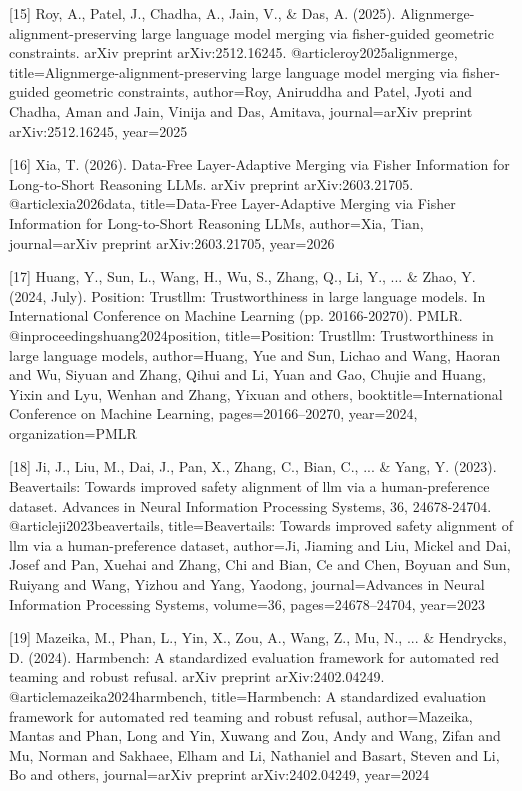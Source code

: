 \documentclass{article}
\begin{document}
{[15] Roy, A., Patel, J., Chadha, A., Jain, V., & Das, A. (2025). Alignmerge-alignment-preserving large language model merging via fisher-guided geometric constraints. arXiv preprint arXiv:2512.16245.
@article{roy2025alignmerge,
  title={Alignmerge-alignment-preserving large language model merging via fisher-guided geometric constraints},
  author={Roy, Aniruddha and Patel, Jyoti and Chadha, Aman and Jain, Vinija and Das, Amitava},
  journal={arXiv preprint arXiv:2512.16245},
  year={2025}
}

[16] Xia, T. (2026). Data-Free Layer-Adaptive Merging via Fisher Information for Long-to-Short Reasoning LLMs. arXiv preprint arXiv:2603.21705.
@article{xia2026data,
  title={Data-Free Layer-Adaptive Merging via Fisher Information for Long-to-Short Reasoning LLMs},
  author={Xia, Tian},
  journal={arXiv preprint arXiv:2603.21705},
  year={2026}
}

[17] Huang, Y., Sun, L., Wang, H., Wu, S., Zhang, Q., Li, Y., ... & Zhao, Y. (2024, July). Position: Trustllm: Trustworthiness in large language models. In International Conference on Machine Learning (pp. 20166-20270). PMLR.
@inproceedings{huang2024position,
  title={Position: Trustllm: Trustworthiness in large language models},
  author={Huang, Yue and Sun, Lichao and Wang, Haoran and Wu, Siyuan and Zhang, Qihui and Li, Yuan and Gao, Chujie and Huang, Yixin and Lyu, Wenhan and Zhang, Yixuan and others},
  booktitle={International Conference on Machine Learning},
  pages={20166--20270},
  year={2024},
  organization={PMLR}
}

[18] Ji, J., Liu, M., Dai, J., Pan, X., Zhang, C., Bian, C., ... & Yang, Y. (2023). Beavertails: Towards improved safety alignment of llm via a human-preference dataset. Advances in Neural Information Processing Systems, 36, 24678-24704.
@article{ji2023beavertails,
  title={Beavertails: Towards improved safety alignment of llm via a human-preference dataset},
  author={Ji, Jiaming and Liu, Mickel and Dai, Josef and Pan, Xuehai and Zhang, Chi and Bian, Ce and Chen, Boyuan and Sun, Ruiyang and Wang, Yizhou and Yang, Yaodong},
  journal={Advances in Neural Information Processing Systems},
  volume={36},
  pages={24678--24704},
  year={2023}
}

[19] Mazeika, M., Phan, L., Yin, X., Zou, A., Wang, Z., Mu, N., ... & Hendrycks, D. (2024). Harmbench: A standardized evaluation framework for automated red teaming and robust refusal. arXiv preprint arXiv:2402.04249.
@article{mazeika2024harmbench,
  title={Harmbench: A standardized evaluation framework for automated red teaming and robust refusal},
  author={Mazeika, Mantas and Phan, Long and Yin, Xuwang and Zou, Andy and Wang, Zifan and Mu, Norman and Sakhaee, Elham and Li, Nathaniel and Basart, Steven and Li, Bo and others},
  journal={arXiv preprint arXiv:2402.04249},
  year={2024}
}

}
\end{document}
